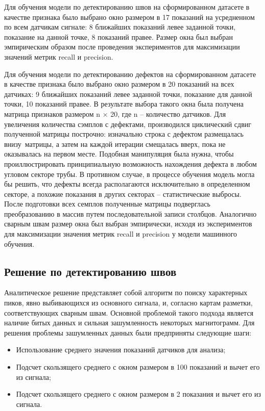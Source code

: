 \documentclass[a4paper,article,14pt]{extarticle}
\begin{document}
Для обучения модели по детектированию швов на сформированном датасете в качестве признака 
было выбрано окно размером в 17 показаний на усредненном по всем датчикам сигнале: 
8 ближайших показаний левее заданной точки, показание на данной точке, 8 показаний правее. 
Размер окна был выбран эмпирическим образом после проведения экспериментов для максимизации значений 
метрик recall и precision.

Для обучения модели по детектированию дефектов на сформированном датасете в качестве признака 
было выбрано окно размером в 20 показаний на всех датчиках: 9 ближайших показаний левее заданной точки, 
показание для данной точки, 10 показаний правее. В результате выбора такого окна была получена матрица 
признаков размером n × 20, где n – количество датчиков. Для увеличения количества сэмплов с дефектами, 
производился циклический сдвиг полученной матрицы построчно: изначально строка с дефектом размещалась \flqq внизу\frqq\, 
матрицы, а затем на каждой итерации смещалась \flqq вверх\frqq, пока не оказывалась на первом месте. Подобная манипуляция 
была нужна, чтобы проиллюстрировать принципиальную возможность нахождения дефекта в любом угловом секторе трубы. 
В противном случае, в процессе обучения модель могла бы решить, что дефекты всегда располагаются исключительно 
в определенном секторе, а похожие показания в других секторах – статистические выбросы. После подготовки всех 
семплов полученные матрицы подверглась преобразованию в массив путем последовательной записи столбцов. 
Аналогично сварным швам размер окна был выбран эмпирически, исходя из экспериментов для максимизации значения 
метрик recall и precision у модели машинного обучения.

\subsection{Решение по детектированию швов}

Аналитическое решение представляет собой алгоритм по поиску характерных пиков, явно выбивающихся из основного сигнала, 
и, согласно картам разметки, соответствующих сварным швам. Основной проблемой такого подхода является наличие битых 
данных и сильная зашумленность некоторых магнитограмм. Для решения проблемы зашумленных данных были предприняты 
следующие шаги: 

\begin{itemize}
    \item Использование среднего значения показаний датчиков для анализа;
    \item Подсчет скользящего среднего с окном размером в 100 показаний и вычет его из сигнала;
    \item Подсчет скользящего среднего с окном размером в 2 показания и вычет его из сигнала. 
\end{itemize}
\end{document}
